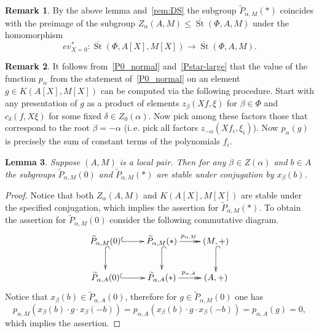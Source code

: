 \documentclass[oneside, 8pt]{amsart}
\newtheorem{lemma}{Lemma}
\theoremstyle{remark}
\theoremstyle{definition}
\numberwithin{lemma}{section}
\numberwithin{prop}{section}
\numberwithin{corollary}{section}
\numberwithin{externaltheorem}{section}
\newtheorem{rem}[lemma]{Remark}
\DeclareMathOperator{\St}{St}
\numberwithin{equation}{section}
\begin{document}
\begin{rem} \label{Pstar-char} 
By the above lemma and~\cref{rem:DS} the subgroup $\widetilde{P}_{\alpha, M}(*)$ coincides with the preimage of the subgroup $Z_\alpha(A, M) \leq \overline{\St}(\Phi, A, M)$ under the homomorphism \[ev_{X=0}^*\colon \overline{\St}(\Phi, A[X], M[X]) \to \overline{\St}(\Phi, A, M).\] \end{rem} 

\begin{rem} \label{rem:palpha} It follows from~\cref{P0_normal} and~\cref{Pstar-large} that the value of the function $p_\alpha$ from the statement of~\cref{P0_normal} on an element $g\in K(A[X], M[X])$ can be computed via the following procedure. 
Start with any presentation of $g$ as a product of elements $z_{\beta}(Xf, \xi)$ for $\beta \in \Phi$ and $c_\delta(f, X\xi)$ for some fixed $\delta\in Z_0(\alpha)$. 
Now pick among these factors those that correspond to the root $\beta = -\alpha$ (i.\,e. pick all factors $z_{-\alpha}(Xf_i, \xi_i)$). 
Now $p_\alpha(g)$ is precisely the sum of constant terms of the polynomials $f_i$. \end{rem}

\begin{lemma} \label{P0-conj-invariant} Suppose $(A, M)$ is a local pair. Then for any $\beta \in Z(\alpha)$ and $b \in A$ the subgroups $\widetilde{P}_{\alpha, M}(0)$ and $\widetilde{P}_{\alpha, M}(*)$ are stable under conjugation by $x_\beta(b)$. \end{lemma}
\begin{proof}
Notice that both $Z_\alpha(A, M)$ and $K(A[X], M[X])$ are stable under the specified conjugation, which implies the assertion for $\widetilde{P}_{\alpha, M}(*)$. 
To obtain the assertion for $\widetilde{P}_{\alpha, M}(0)$ consider the following commutative diagram. \[ \xymatrix{ \widetilde{P}_{\alpha, M}(0) \ar@{^{(}->}[r] \ar@{^{(}->}[d] & \widetilde{P}_{\alpha, M}(*) \ar@{->>}[r]^{p_{\alpha, M}} \ar@{^{(}->}[d] & (M, +) \ar@{^{(}->}[d] \\ \widetilde{P}_{\alpha, A}(0) \ar@{^{(}->}[r] & \widetilde{P}_{\alpha, A}(*) \ar@{->>}[r]^{p_{\alpha, A}} & (A, +)} \]
Notice that $x_\beta(b) \in \widetilde{P}_{\alpha, A}(0)$, therefore for $g \in \widetilde{P}_{\alpha, M}(0)$ one has \[p_{\alpha, M}(x_\beta(b) \cdot g \cdot x_\beta(-b)) = p_{\alpha, A}(x_\beta(b) \cdot g \cdot x_\beta(-b)) = p_{\alpha, A}(g) = 0,\] which implies the assertion.\end{proof}
\end{document}
